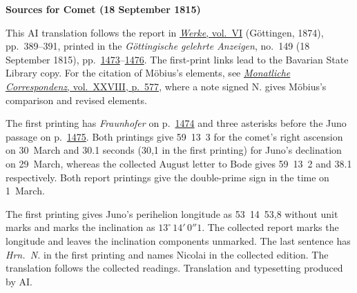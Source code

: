 \clearpage\thispagestyle{empty}
\begin{center}\textbf{Sources for Comet (18 September 1815)}\end{center}
\noindent This AI translation follows the report in \href{https://gdz.sub.uni-goettingen.de/id/PPN236007467}{\textit{Werke}, vol.~VI} (Göttingen, 1874), pp.~389--391, printed in the \textit{Göttingische gelehrte Anzeigen}, no.~149 (18 September 1815), pp.~\href{https://api.digitale-sammlungen.de/iiif/image/v2/bsb10538688_00113/full/1600,/0/default.jpg}{1473}--\href{https://api.digitale-sammlungen.de/iiif/image/v2/bsb10538688_00116/full/1600,/0/default.jpg}{1476}. The first-print links lead to the Bavarian State Library copy. For the citation of Möbius’s elements, see \href{https://api.digitale-sammlungen.de/iiif/image/v2/bsb10538617_00593/full/1600,/0/default.jpg}{\textit{Monatliche Correspondenz}, vol.~XXVIII, p.~577}, where a note signed N. gives Möbius’s comparison and revised elements.
\par\smallskip\noindent The first printing has \textit{Fraunhofer} on p.~\href{https://api.digitale-sammlungen.de/iiif/image/v2/bsb10538688_00114/full/1600,/0/default.jpg}{1474} and three asterisks before the Juno passage on p.~\href{https://api.digitale-sammlungen.de/iiif/image/v2/bsb10538688_00115/full/1600,/0/default.jpg}{1475}. Both printings give 59~13~3 for the comet’s right ascension on 30~March and 30.1 seconds (30,1 in the first printing) for Juno’s declination on 29~March, whereas the collected August letter to Bode gives 59~13~2 and 38.1 respectively. Both report printings give the double-prime sign in the time on 1~March.
\par\smallskip\noindent The first printing gives Juno’s perihelion longitude as 53~14~53,8 without unit marks and marks the inclination as $13^\circ\,14'\,0''1$. The collected report marks the longitude and leaves the inclination components unmarked. The last sentence has \textit{Hrn.\ N.} in the first printing and names Nicolai in the collected edition. The translation follows the collected readings. Translation and typesetting produced by AI.
\clearpage
